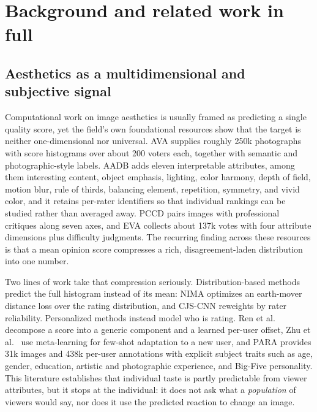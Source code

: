 \documentclass[10pt,twocolumn,letterpaper]{article}
\begin{document}
\section{Background and related work in full}
\label{sup:related}

\subsection{Aesthetics as a multidimensional and subjective signal}
Computational work on image aesthetics is usually framed as predicting a single quality score, yet the field's own foundational resources show that the target is neither one-dimensional nor universal. AVA \citep{murray2012ava} supplies roughly 250k photographs with score histograms over about 200 voters each, together with semantic and photographic-style labels. AADB \citep{kong2016aadb} adds eleven interpretable attributes, among them interesting content, object emphasis, lighting, color harmony, depth of field, motion blur, rule of thirds, balancing element, repetition, symmetry, and vivid color, and it retains per-rater identifiers so that individual rankings can be studied rather than averaged away. PCCD \citep{chang2017pccd} pairs images with professional critiques along seven axes, and EVA \citep{kang2020eva} collects about 137k votes with four attribute dimensions plus difficulty judgments. The recurring finding across these resources is that a mean opinion score compresses a rich, disagreement-laden distribution into one number.

Two lines of work take that compression seriously. Distribution-based methods predict the full histogram instead of its mean: NIMA \citep{talebi2018nima} optimizes an earth-mover distance loss over the rating distribution, and CJS-CNN \citep{jin2018cjs} reweights by rater reliability. Personalized methods instead model who is rating. Ren et al.\ \citep{ren2017personalized} decompose a score into a generic component and a learned per-user offset, Zhu et al.\ \citep{zhu2022meta} use meta-learning for few-shot adaptation to a new user, and PARA \citep{yang2022para} provides 31k images and 438k per-user annotations with explicit subject traits such as age, gender, education, artistic and photographic experience, and Big-Five personality. This literature establishes that individual taste is partly predictable from viewer attributes, but it stops at the individual: it does not ask what a \emph{population} of viewers would say, nor does it use the predicted reaction to change an image.
\end{document}
